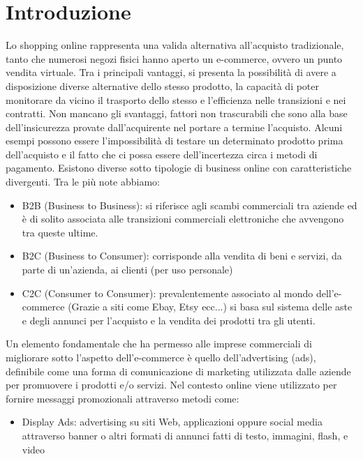 \documentclass[10pt,a4paper]{article}
\begin{document}
\section{Introduzione}
    Lo shopping online rappresenta una valida alternativa all’acquisto tradizionale, tanto che numerosi negozi fisici hanno aperto un e-commerce, ovvero un punto vendita virtuale.
\hfill \break \break
    Tra i principali vantaggi, si presenta la possibilità di avere a disposizione diverse alternative dello stesso prodotto, la capacità di poter monitorare da vicino il trasporto dello stesso e l'efficienza nelle transizioni e nei contratti.
\hfill \break \break
    Non mancano gli svantaggi, fattori non trascurabili che sono alla base dell'insicurezza provate dall'acquirente nel portare a termine l'acquisto.
    Alcuni esempi possono essere l'impossibilità di testare un determinato prodotto prima dell'acquisto e il fatto che ci possa essere dell'incertezza circa i metodi di pagamento.
\hfill \break \break
    Esistono diverse sotto tipologie di business online con caratteristiche divergenti.
    Tra le più note abbiamo:
\begin{itemize}
    \item B2B (Business to Business): si riferisce agli scambi commerciali tra aziende ed è di solito associata alle transizioni commerciali elettroniche che avvengono tra queste ultime.
\end{itemize}
\begin{itemize}
    \item B2C (Business to Consumer): corrisponde alla vendita di beni e servizi, da parte di un'azienda, ai clienti (per uso personale)
\end{itemize}
\begin{itemize}
    \item C2C (Consumer to Consumer): prevalentemente associato al mondo dell'e-commerce (Grazie a siti come Ebay, Etsy ecc...) si basa sul sistema delle aste e degli annunci per l'acquisto e la vendita dei prodotti tra gli utenti.
\end{itemize}
Un elemento fondamentale che ha permesso alle imprese commerciali di migliorare sotto l'aspetto dell'e-commerce è quello dell'advertising (ads), definibile come una forma di comunicazione di marketing utilizzata dalle aziende per promuovere i prodotti e/o servizi.
Nel contesto online viene utilizzato per fornire messaggi promozionali attraverso metodi come:
\begin{itemize}
    \item Display Ads: advertising su siti Web, applicazioni oppure social media attraverso banner o altri formati di annunci fatti di testo, immagini, flash, e video
\end{itemize}
\end{document}
